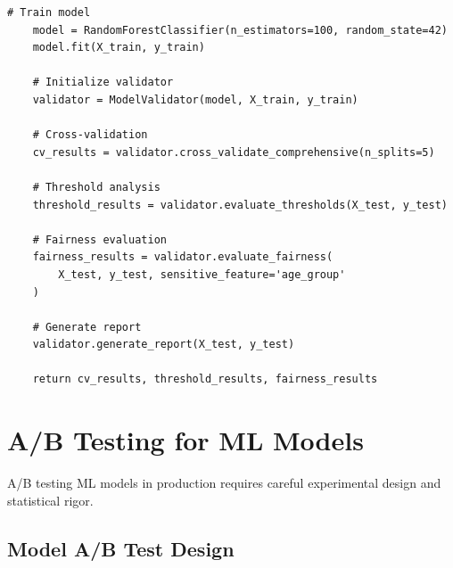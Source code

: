 \begin{lstlisting}[style=python, caption=Production Model Validation Framework]
    # Train model
    model = RandomForestClassifier(n_estimators=100, random_state=42)
    model.fit(X_train, y_train)

    # Initialize validator
    validator = ModelValidator(model, X_train, y_train)

    # Cross-validation
    cv_results = validator.cross_validate_comprehensive(n_splits=5)

    # Threshold analysis
    threshold_results = validator.evaluate_thresholds(X_test, y_test)

    # Fairness evaluation
    fairness_results = validator.evaluate_fairness(
        X_test, y_test, sensitive_feature='age_group'
    )

    # Generate report
    validator.generate_report(X_test, y_test)

    return cv_results, threshold_results, fairness_results
\end{lstlisting}

\section{A/B Testing for ML Models}

A/B testing ML models in production requires careful experimental design and statistical rigor.

\subsection{Model A/B Test Design}

